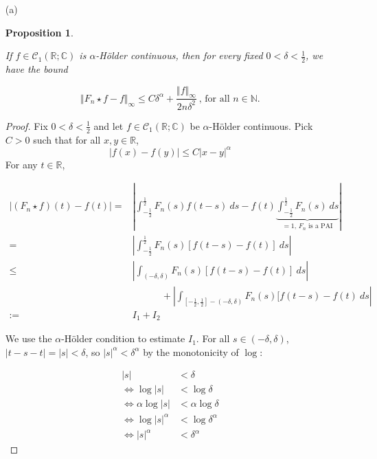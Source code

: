 \documentclass[12pt, reqno]{article}
\newtheorem{prop}{Proposition}[section]
\theoremstyle{definition}
\theoremstyle{remark}
\begin{document}
\begin{itemize}
\item[(a)] 

\begin{prop} \label{one_a}

    If $f\in\mathcal{C}_1(\mathbb{R;C})$ is $\alpha$-H\"older continuous, then for every fixed $0<\delta<\frac{1}{2}$, we have the bound 

    \begin{equation} \label{eq_apriori}
        \Vert F_n \star f - f \Vert_\infty \leq C \delta^\alpha + \dfrac{\Vert f \Vert_\infty}{2 n \delta^2} ~\mbox{, for all $n \in \mathbb{N}$.}
        \end{equation}
\end{prop}

\begin{proof}
    Fix $0<\delta< \frac{1}{2}$ and let $f\in\mathcal{C}_{1}(\mathbb{R};\mathbb{C})$ be $\alpha$-Hölder continuous. Pick $C>0$ such that for all $x,y\in \mathbb{R}$, \[|f(x)-f(y)|\le C|x-y|^{\alpha}\]
For any $t\in \mathbb{R}$,

\begin{align*}
|(F_{n}\star f)(t)-f(t)|=& \left|\int_{- \frac{1}{2}}^{\frac{1}{2}} F_{n}(s)f(t-s)\ ds-f(t)\underbrace{\int_{- \frac{1}{2}}^{\frac{1}{2}}F_{n}(s)\ ds}_{=1 \text{, }F_{n} \text{ is a PAI}} \right|\\
=& \left|\int_{- \frac{1}{2}}^{\frac{1}{2}} F_{n}(s)[f(t-s)-f(t)]\ ds\right|\\
\le& \left|\int_{(-\delta,\delta)}F_{n}(s)[f(t-s)-f(t)]\ ds\right|\\
&\quad\quad\quad+\left|\int_{[- \frac{1}{2}, \frac{1}{2}]-(-\delta,\delta)}F_{n}(s)[f(t-s)-f(t)\ ds\right|\\
:=& I_{1}+I_{2} 
\end{align*}

We use the $\alpha$-Hölder condition to estimate $I_{1}$. For all $s\in(- \delta, \delta)$, $|t-s-t|=|s|<\delta$, so $|s|^{\alpha}<\delta^\alpha$ by the monotonicity of $\log$:

\begin{align*}
|s|&< \delta\\
\iff\log|s|&< \log \delta\\
\iff \alpha\log|s|&< \alpha\log \delta\\
\iff\log|s|^{\alpha}&< \log \delta^{\alpha}\\
\iff |s|^{\alpha}&< \delta^{\alpha}
\end{align*}


\end{proof}
\end{itemize}
\end{document}
